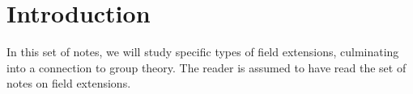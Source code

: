 \section{Introduction}

In this set of notes, we will study specific types of field extensions, culminating into a connection to group theory. The reader is assumed to have read the set of notes on field extensions.